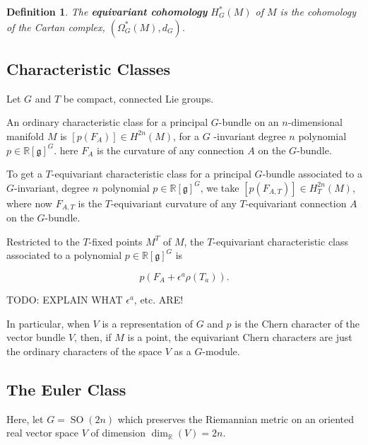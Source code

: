 \documentclass{article}
\newtheorem{defn}[theorem]{Definition\rm}
\newcommand{\W}{\Omega}
\newcommand{\e}{\epsilon}
\newcommand{\RR}{\mathbb{R}}
\newcommand{\mfg}{\mathfrak{g}}
\DeclareMathOperator{\SO}{SO}
\begin{document}
\begin{defn}
	The \textbf{equivariant cohomology} $H_{G}^{\ast}(M)$ of $M$ is the cohomology of the Cartan complex, $(\W_{G}^{\ast}(M), d_{G})$.
\end{defn}

\subsection{Characteristic Classes}

Let $G$ and $T$ be compact, connected Lie groups.

An ordinary characteristic class for a principal $G$-bundle on an $n$-dimensional manifold $M$ is $[p(F_{A})] \in H^{2n}(M)$, for a $G$ -invariant degree $n$ polynomial $p \in \RR[\mfg]^{G}$. here $F_{A}$ is the curvature of any connection $A$ on the $G$-bundle.

To get a $T$-equivariant characteristic class for a principal $G$-bundle associated to a $G$-invariant, degree $n$ polynomial $p \in \RR[\mfg]^{G}$, we take $[p(F_{A, T})] \in H_{T}^{2n}(M)$, where now $F_{A,T}$ is the $T$-equivariant curvature of any $T$-equivariant connection $A$ on the $G$-bundle.

Restricted to the $T$-fixed points $M^{T}$ of $M$, the $T$-equivariant characteristic class associated to a polynomial $p \in \RR[\mfg]^{G}$ is

\begin{equation*}
	p(F_{A} + \e^{a}\rho(T_{a})).
\end{equation*}

TODO: EXPLAIN WHAT $\e^{a}$, etc. ARE!

In particular, when $V$ is a representation of $G$ and $p$ is the Chern character of the vector bundle $V$, then, if $M$ is a point, the equivariant Chern characters are just the ordinary characters of the space $V$ as a $G$-module.

\subsection{The Euler Class}

Here, let $G = \SO(2n)$ which preserves the Riemannian metric on an oriented real vector space $V$ of dimension $\dim_{\RR}(V) = 2n$.
\end{document}
